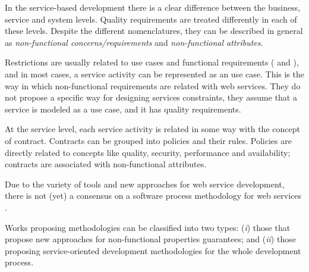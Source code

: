  
   


In the service-based development there is a clear difference between the
business, service and system levels. Quality requirements are treated
differently in each of these levels. Despite the different nomenclatures, they
can be described in general as \textit{non-functional concerns/requirements} and
\textit{non-functional attributes}.
  
Restrictions are usually related to use cases and functional requirements
(\cite{ieee_1998} and \cite{sommerville08}), and in most cases, a service
activity can be represented as an use case. This is the way in which
non-functional requirements are related with web services. They do not propose a
specific way for designing services constraints, they assume that a service is
modeled as a use case, and it has quality requirements.

At the service level, each service activity is related in some way with the
concept of contract. Contracts can be grouped into policies and their
rules. Policies are directly related to concepts like quality,
security, performance and availability; contracts are associated with non-functional attributes. 

\bigskip
\bigskip

Due to the variety of tools and new approaches for web service development,
there is not (yet) a consensus on a software process methodology for web
services
\cite{PapazoglouH06,Papazoglou03,Milanovic2006,MilanovicM06,FeuerlichtM05,Ramollari_asurvey,somet2005}.
 
Works proposing methodologies can be
classified into two types: (\textit{i}) those that propose new approaches for non-functional
properties guarantees; and (\textit{ii}) those proposing service-oriented
development methodologies for the whole development process.
    
